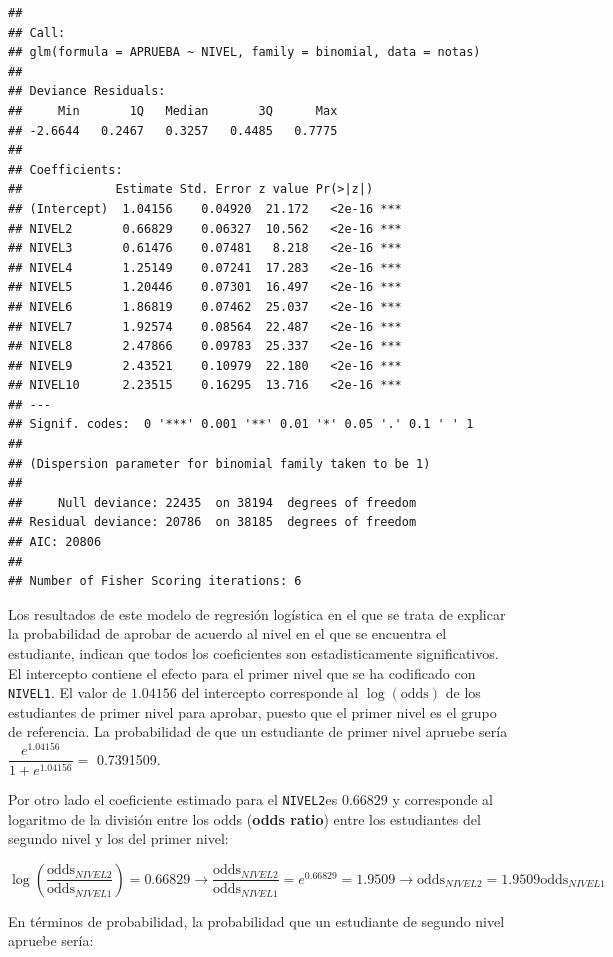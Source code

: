 \documentclass[letterpaper,]{book}
\begin{document}
\begin{verbatim}
## 
## Call:
## glm(formula = APRUEBA ~ NIVEL, family = binomial, data = notas)
## 
## Deviance Residuals: 
##     Min       1Q   Median       3Q      Max  
## -2.6644   0.2467   0.3257   0.4485   0.7775  
## 
## Coefficients:
##             Estimate Std. Error z value Pr(>|z|)    
## (Intercept)  1.04156    0.04920  21.172   <2e-16 ***
## NIVEL2       0.66829    0.06327  10.562   <2e-16 ***
## NIVEL3       0.61476    0.07481   8.218   <2e-16 ***
## NIVEL4       1.25149    0.07241  17.283   <2e-16 ***
## NIVEL5       1.20446    0.07301  16.497   <2e-16 ***
## NIVEL6       1.86819    0.07462  25.037   <2e-16 ***
## NIVEL7       1.92574    0.08564  22.487   <2e-16 ***
## NIVEL8       2.47866    0.09783  25.337   <2e-16 ***
## NIVEL9       2.43521    0.10979  22.180   <2e-16 ***
## NIVEL10      2.23515    0.16295  13.716   <2e-16 ***
## ---
## Signif. codes:  0 '***' 0.001 '**' 0.01 '*' 0.05 '.' 0.1 ' ' 1
## 
## (Dispersion parameter for binomial family taken to be 1)
## 
##     Null deviance: 22435  on 38194  degrees of freedom
## Residual deviance: 20786  on 38185  degrees of freedom
## AIC: 20806
## 
## Number of Fisher Scoring iterations: 6
\end{verbatim}

Los resultados de este modelo de regresión logística en el que se trata de explicar la probabilidad de aprobar de acuerdo al nivel en el que se encuentra el estudiante, indican que todos los coeficientes son estadisticamente significativos. El intercepto contiene el efecto para el primer nivel que se ha codificado con \texttt{NIVEL1}. El valor de \(1.04156\) del intercepto corresponde al \(\log \left( \text{odds} \right)\) de los estudiantes de primer nivel para aprobar, puesto que el primer nivel es el grupo de referencia. La probabilidad de que un estudiante de primer nivel apruebe sería \(\dfrac{e^{1.04156}}{1+e^{1.04156}} =\) 0.7391509.

Por otro lado el coeficiente estimado para el \texttt{NIVEL2}es \(0.66829\) y corresponde al logaritmo de la división entre los odds (\textbf{odds ratio}) entre los estudiantes del segundo nivel y los del primer nivel:

\[\log \left( \dfrac{\text{odds}_{NIVEL2}}{\text{odds}_{NIVEL1}}\right)=0.66829 \rightarrow \dfrac{\text{odds}_{NIVEL2}}{\text{odds}_{NIVEL1}}=e^{0.66829}=1.9509\rightarrow \text{odds}_{NIVEL2} = 1.9509\text{odds}_{NIVEL1}\]

En términos de probabilidad, la probabilidad que un estudiante de segundo nivel apruebe sería:
\end{document}
